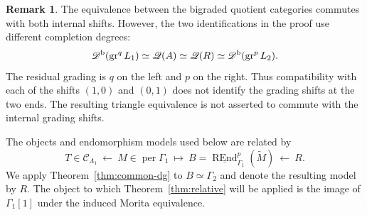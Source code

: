 \documentclass[12pt,a4paper,english,reqno]{amsart}
\theoremstyle{plain}
\theoremstyle{definition}
\newtheorem{rmk}[thm]{Remark}
\numberwithin{equation}{section}
\newcommand{\thmref}[1]{Theorem~\ref{#1}}
\def\Ga{\Gamma}
\def\La{\Lambda}
\def\Db{{\mathcal D}^{\text{\rm b}}}
\def\perf{\operatorname{per}}
\def\calC{{\mathcal C}}
\def\REnd{\operatorname{REnd}}
\def\gr{\operatorname{gr}}
\newcommand{\uREnd}{\underline{\REnd}}
\begin{document}
\begin{rmk}\label{rmk:residual-shifts}
The equivalence between the bigraded quotient categories
commutes with both internal shifts. However, the two
identifications in the proof use different completion
degrees:
\[
 \Db(\gr^{q}L_1)
 \simeq \mathcal Q(A)
 \simeq \mathcal Q(R)
 \simeq \Db(\gr^{p}L_2).
\]
The residual grading is $q$ on the left and $p$ on the right.
Thus compatibility with each of the shifts $(1,0)$ and
$(0,1)$ does not identify the grading shifts at the two
ends. The resulting triangle equivalence is not asserted
to commute with the internal grading shifts.
\end{rmk}

The objects and endomorphism models used below are related by
\[
 T\in\calC_{\La_1}
 \ \longleftarrow\ M\in\perf\Ga_1
 \ \longmapsto\ B=\uREnd^p_{\Ga_1}(\widetilde M)
 \ \longleftarrow\ R.
\]
We apply \thmref{thm:common-dg} to $B\simeq\Ga_2$ and denote the resulting model by $R$. The object to which \thmref{thm:relative} will be applied is the image of $\Ga_1[1]$ under the induced Morita equivalence.
\end{document}
